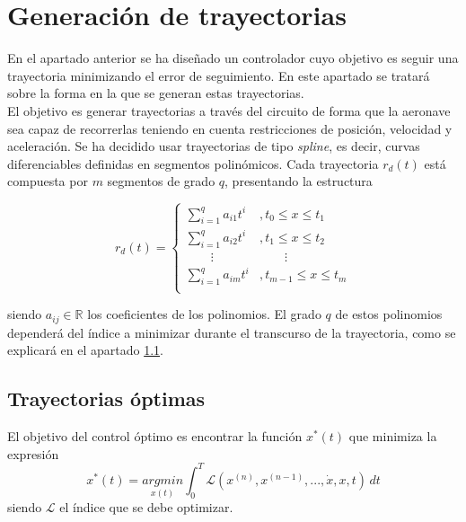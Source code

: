\chapter{Generación de trayectorias}

En el apartado anterior se ha diseñado un controlador cuyo objetivo es seguir una trayectoria  minimizando el error de seguimiento. En este apartado se tratará sobre la forma en la que se generan estas trayectorias.\\

El objetivo es generar trayectorias a través del circuito de forma que la aeronave sea capaz de recorrerlas teniendo en cuenta restricciones de posición, velocidad y aceleración.
 Se ha decidido usar trayectorias de tipo \textit{spline}, es decir, curvas diferenciables definidas en segmentos polinómicos. Cada trayectoria $r_d(t)$ está compuesta por $m$ segmentos de grado $q$, presentando la estructura

\begin{equation}
	r_d(t) = \left\{ 
	\begin{array}{ll}
		\sum_{i=1}^{q}a_{i1}t^{i} &,t_0\leq x \leq t_1 \\
		\sum_{i=1}^{q}a_{i2}t^{i} &,t_1\leq x \leq t_2 \\
		\qquad\vdots &\qquad\vdots \\
		\sum_{i=1}^{q}a_{im}t^{i} &,t_{m-1}\leq x \leq t_m \\
	\end{array}
	\right.
\end{equation}

siendo $a_{ij}\in \mathbb{R}$ los coeficientes de los polinomios. El grado $q$ de estos polinomios dependerá del índice a minimizar durante el transcurso de la trayectoria, como se explicará en el apartado \ref{trajectoriasoptimas:cap}.



\section{Trayectorias óptimas}\label{trajectoriasoptimas:cap}
El objetivo del control óptimo es encontrar la función $x^*(t)$ que minimiza la expresión
\begin{equation}
	x^*(t) =  \underset{x(t)}{argmin}\int_{0}^{T}\mathcal{L}\left(x^{(n)},x^{(n-1)},...,\dot{x},x,t\right)\, dt
\end{equation}
siendo $\mathcal{L}$ el índice que se debe optimizar.


